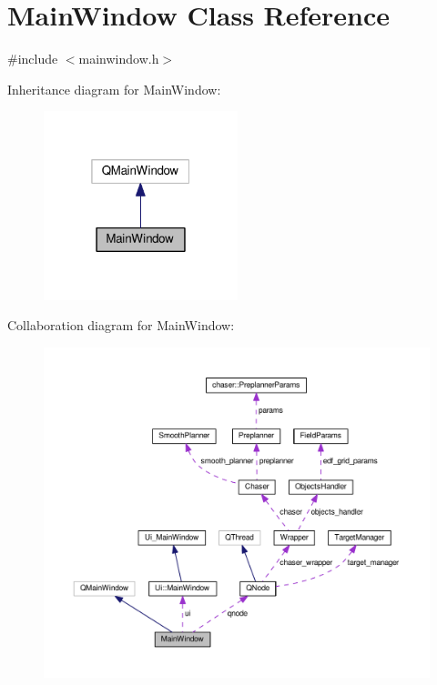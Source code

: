 \hypertarget{class_main_window}{}\section{Main\+Window Class Reference}
\label{class_main_window}


{\ttfamily \#include $<$mainwindow.\+h$>$}



Inheritance diagram for Main\+Window\+:\nopagebreak
\begin{figure}[H]
\begin{center}
\leavevmode
\includegraphics[width=160pt]{class_main_window__inherit__graph}
\end{center}
\end{figure}


Collaboration diagram for Main\+Window\+:
\nopagebreak
\begin{figure}[H]
\begin{center}
\leavevmode
\includegraphics[width=350pt]{class_main_window__coll__graph}
\end{center}
\end{figure}
